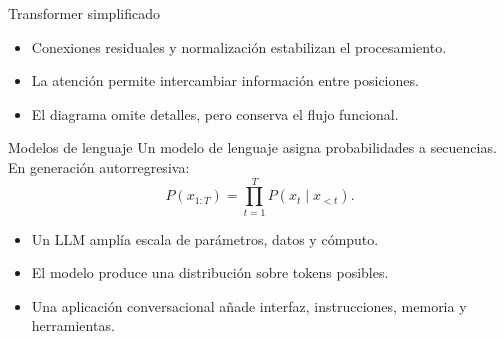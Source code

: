 \documentclass[aspectratio=169,10pt]{beamer}
\begin{document}
\begin{frame}{Transformer simplificado}
  \begin{center}
  \end{center}
  \begin{itemize}
    \item Conexiones residuales y normalización estabilizan el procesamiento.
    \item La atención permite intercambiar información entre posiciones.
    \item El diagrama omite detalles, pero conserva el flujo funcional.
  \end{itemize}
\end{frame}

\begin{frame}{Modelos de lenguaje}
  Un modelo de lenguaje asigna probabilidades a secuencias. En generación autorregresiva:
  \[
    P(x_{1:T})=\prod_{t=1}^{T}P(x_t\mid x_{<t}).
  \]
  \begin{itemize}
    \item Un LLM amplía escala de parámetros, datos y cómputo.
    \item El modelo produce una distribución sobre tokens posibles.
    \item Una aplicación conversacional añade interfaz, instrucciones, memoria y herramientas.
  \end{itemize}
\end{frame}
\end{document}
